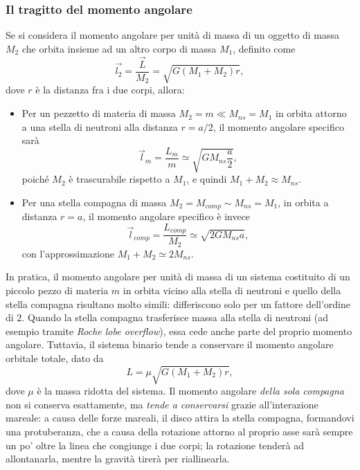 \subsubsection{Il tragitto del momento angolare}
Se si considera il momento angolare per unità di massa di un oggetto di massa $M_2$ che orbita insieme ad un altro corpo di massa $M_1$, definito come
\begin{equation}
    \vec{l_2} = \frac{\vec{L}}{M_2} = \sqrt{G(M_1+M_2)r},
\end{equation}
dove $r$ è la distanza fra i due corpi, allora:
\begin{itemize}
    \item Per un pezzetto di materia di massa $M_2 = m \ll M_{ns} = M_1$ in orbita attorno a una stella di neutroni alla distanza $r = a/2$, il momento angolare specifico sarà
    \begin{equation}
        \vec{l}_m = \frac{L_m}{m} \simeq \sqrt{GM_{ns}\frac{a}{2}},
    \end{equation}
    poiché $M_2$ è trascurabile rispetto a $M_1$, e quindi $M_1 + M_2 \approx M_{ns}$.
    \item Per una stella compagna di massa $M_2 = M_{comp} \sim M_{ns} = M_1$, in orbita a distanza $r = a$, il momento angolare specifico è invece
    \begin{equation}
        \vec{l}_{comp} = \frac{L_{comp}}{M_2} \simeq \sqrt{2GM_{ns}a},
    \end{equation}
    con l'approssimazione $M_1 + M_2 \simeq 2M_{ns}$.
\end{itemize}
In pratica, il momento angolare per unità di massa di un sistema costituito di un piccolo pezzo di materia $m$ in orbita vicino alla stella di neutroni e quello della stella compagna risultano molto simili: differiscono solo per un fattore dell'ordine di $2$.
Quando la stella compagna trasferisce massa alla stella di neutroni (ad esempio tramite \emph{Roche lobe overflow}), essa cede anche parte del proprio momento angolare. Tuttavia, il sistema binario tende a conservare il momento angolare orbitale totale, dato da
\begin{equation}
    L = \mu \sqrt{G(M_1+M_2)r},
\end{equation}
dove $\mu$ è la massa ridotta del sistema.
Il momento angolare \emph{della sola compagna} non si conserva esattamente, ma \textit{tende a conservarsi} grazie all'interazione mareale: a causa delle forze mareali, il disco attira la stella compagna, formandovi una protuberanza, che a causa della rotazione attorno al proprio asse sarà sempre un po' oltre la linea che congiunge i due corpi; la rotazione tenderà ad allontanarla, mentre la gravità tirerà per riallinearla.
